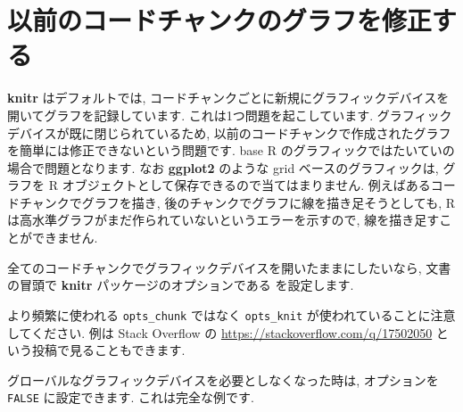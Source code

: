 \documentclass[
  11pt,
  lualatex,ja=standard,jafont=noto]{bxjsreport}
\newenvironment{Shaded}{\begin{snugshade}}{\end{snugshade}}
\newcommand{\AttributeTok}[1]{\textcolor[rgb]{0.77,0.63,0.00}{#1}}
\newcommand{\ConstantTok}[1]{\textcolor[rgb]{0.00,0.00,0.00}{#1}}
\newcommand{\FunctionTok}[1]{\textcolor[rgb]{0.00,0.00,0.00}{#1}}
\newcommand{\NormalTok}[1]{#1}
\newcommand{\SpecialCharTok}[1]{\textcolor[rgb]{0.00,0.00,0.00}{#1}}
\begin{document}
\hypertarget{global-device}{%
\section{以前のコードチャンクのグラフを修正する}\label{global-device}}

\textbf{knitr} はデフォルトでは, コードチャンクごとに新規にグラフィックデバイスを開いてグラフを記録しています. これは1つ問題を起こしています. グラフィックデバイスが既に閉じられているため, 以前のコードチャンクで作成されたグラフを簡単には修正できないという問題です. base R のグラフィックではたいていの場合で問題となります. なお \textbf{ggplot2} \autocite{R-ggplot2} のような grid ベースのグラフィックは, グラフを R オブジェクトとして保存できるので当てはまりません. 例えばあるコードチャンクでグラフを描き, 後のチャンクでグラフに線を描き足そうとしても, R は高水準グラフがまだ作られていないというエラーを示すので, 線を描き足すことができません.

全てのコードチャンクでグラフィックデバイスを開いたままにしたいなら, 文書の冒頭で \textbf{knitr} パッケージのオプションである  を設定します.

\begin{Shaded}
\end{Shaded}

より頻繁に使われる \texttt{opts\_chunk} ではなく \texttt{opts\_knit} が使われていることに注意してください. 例は Stack Overflow の \url{https://stackoverflow.com/q/17502050} という投稿で見ることもできます.

グローバルなグラフィックデバイスを必要としなくなった時は, オプションを \texttt{FALSE} に設定できます. これは完全な例です.
\end{document}

